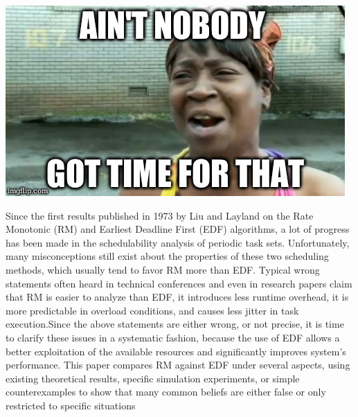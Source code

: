 \begin{frame}{\subsecname}
\includegraphics[width=\textwidth]{graphics/memes/aintnobody.jpg}
\end{frame}

\begin{frame}{\subsecname}
\tiny Since the first results published in 1973 by Liu and Layland on the Rate Monotonic (RM) and Earliest Deadline First (EDF) algorithms, a lot of progress has been made in the schedulability analysis of periodic task sets. Unfortunately, many \Large misconceptions \tiny still exist about the properties of these two scheduling methods, which usually tend to favor RM more than EDF. Typical wrong statements often heard in technical conferences and even in research papers claim that RM is easier to analyze than EDF, it introduces less runtime overhead, it is more predictable in overload conditions, and causes less jitter in task execution.Since the above statements are either wrong, or not precise, it is time to clarify these issues in a systematic fashion, because the use of EDF allows a better exploitation of the available resources and significantly improves system’s performance. This paper compares RM against EDF under several aspects, using existing theoretical results, specific simulation experiments, or simple counterexamples to show that many common beliefs are either false or only restricted to specific situations
\end{frame}
	
